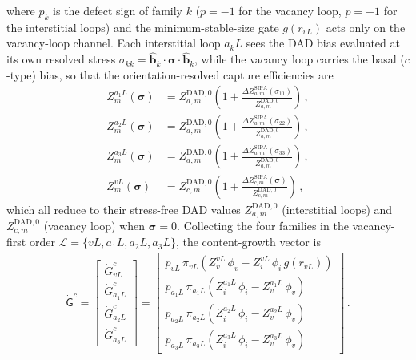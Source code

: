 \documentclass{article}
\newcommand{\spvec}[1]{\bm{\mathsf{#1}}}   %
\begin{document}
where $p_k$ is the defect sign of family $k$ ($p=-1$ for the vacancy loop, $p=+1$ for the interstitial loops) and the minimum-stable-size gate $g(r_{vL})$ acts only on the vacancy-loop channel. Each interstitial loop $a_kL$ sees the DAD bias evaluated at its own resolved stress $\sigma_{kk}=\hat{\bm b}_k\cdot\bm\sigma\cdot\hat{\bm b}_k$, while the vacancy loop carries the basal ($c$-type) bias, so that the orientation-resolved capture efficiencies are
\begin{align}Z^{a_1L}_m(\bm\sigma)&=Z^{\mathrm{DAD},0}_{a,m}\left(1+\frac{\Delta Z^{\mathrm{SIPA}}_{a,m}(\sigma_{11})}{Z^{\mathrm{DAD},0}_{a,m}}\right)\, ,\label{eq:Za1}\\
Z^{a_2L}_m(\bm\sigma)&=Z^{\mathrm{DAD},0}_{a,m}\left(1+\frac{\Delta Z^{\mathrm{SIPA}}_{a,m}(\sigma_{22})}{Z^{\mathrm{DAD},0}_{a,m}}\right)\, ,\label{eq:Za2}\\
Z^{a_3L}_m(\bm\sigma)&=Z^{\mathrm{DAD},0}_{a,m}\left(1+\frac{\Delta Z^{\mathrm{SIPA}}_{a,m}(\sigma_{33})}{Z^{\mathrm{DAD},0}_{a,m}}\right)\, ,\label{eq:Za3}\\
Z^{vL}_m(\bm\sigma)&=Z^{\mathrm{DAD},0}_{c,m}\left(1+\frac{\Delta Z^{\mathrm{SIPA}}_{c,m}(\bm\sigma)}{Z^{\mathrm{DAD},0}_{c,m}}\right)\, ,\label{eq:ZvL}
\end{align}
which all reduce to their stress-free DAD values $Z^{\mathrm{DAD},0}_{a,m}$ (interstitial loops) and $Z^{\mathrm{DAD},0}_{c,m}$ (vacancy loop) when $\bm\sigma=0$. Collecting the four families in the vacancy-first order $\mathcal L=\{vL,a_1L,a_2L,a_3L\}$, the content-growth vector is
\begin{align}\label{eq:Gcarray}
\dot{\spvec{G}}^{c}=
\begin{bmatrix}
\dot G^{c}_{vL}\\[3pt]
\dot G^{c}_{a_1L}\\[3pt]
\dot G^{c}_{a_2L}\\[3pt]
\dot G^{c}_{a_3L}
\end{bmatrix}
=
\begin{bmatrix}
p_{vL}\,\pi_{vL}\left(Z^{vL}_{v}\,\phi_v-Z^{vL}_{i}\,\phi_i\,g(r_{vL})\right)\\[3pt]
p_{a_1L}\,\pi_{a_1L}\left(Z^{a_1L}_{i}\,\phi_i-Z^{a_1L}_{v}\,\phi_v\right)\\[3pt]
p_{a_2L}\,\pi_{a_2L}\left(Z^{a_2L}_{i}\,\phi_i-Z^{a_2L}_{v}\,\phi_v\right)\\[3pt]
p_{a_3L}\,\pi_{a_3L}\left(Z^{a_3L}_{i}\,\phi_i-Z^{a_3L}_{v}\,\phi_v\right)
\end{bmatrix}\, .
\end{align}
\end{document}
